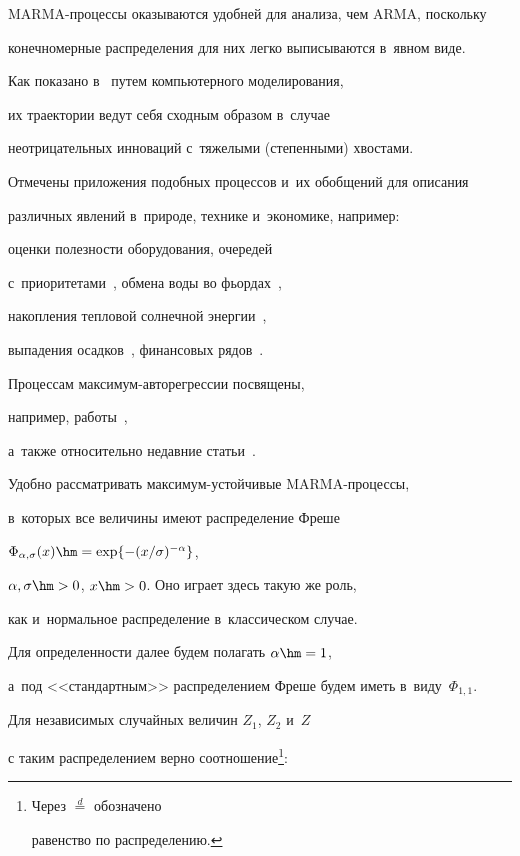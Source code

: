 MARMA-процессы оказываются удобней для анализа, чем ARMA, поскольку


конечномерные распределения для них легко выписываются в~явном виде.


Как показано в~\cite{DR1} путем компьютерного моделирования,


их траектории ведут себя сходным образом в~случае


неотрицательных инноваций с~тяжелыми (степенными) хвостами.





Отмечены приложения подобных процессов и~их обобщений для описания


различных явлений в~природе, технике и~экономике, например:


оценки полезности оборудования, очередей 


с~приоритетами~\cite{DR1}, обмена воды во фьордах~\cite{Voda},


накопления тепловой солнечной энергии~\cite{Teplo},


выпадения осадков~\cite{Coles}, финансовых рядов~\cite{SZ}.


Процессам мак\-си\-мум-ав\-то\-ре\-грес\-сии посвящены,


например,  работы~\cite{Alp1, Alp2},


а~также относительно недавние статьи~\cite{FerrM, Ferr}.





Удобно рассматривать максимум-устой\-чи\-вые MARMA-про\-цес\-сы,


в~которых все величины имеют распределение Фреше


$\Phi_{\alpha,\sigma}(x)\hm=\exp\{-(x/\sigma)^{-\alpha}\}$,


$\alpha,\sigma\hm>0$, $x\hm>0$. Оно играет здесь такую же роль,


как и~нормальное распределение в~классическом случае.


Для определенности далее будем полагать $\alpha\hm=1$,


а~под <<стандартным>> распределением Фреше будем иметь в~виду~$\Phi_{1,1}$.





Для независимых случайных величин $Z_1$, $Z_2$ и~$Z$


с таким распределением верно соотношение\footnote[2]{Через $\stackrel{d}{=}$ обозначено


равенство по распределению.}:


